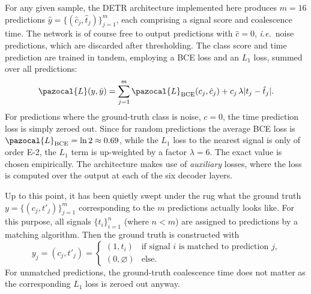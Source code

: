 For any given sample, the DETR architecture implemented here produces $m=16$ predictions $\hat{y}=\{(\hat{c}_j,\hat{t}_j)\}_{j=1}^{m}$, each comprising a signal score and coalescence time. The network is of course free to output predictions with $\hat{c}=0$, \emph{i.e.}\ noise predictions, which are discarded after thresholding. The class score and time prediction are trained in tandem, employing a BCE loss and an $L_1$ loss, summed over all predictions:
\begin{equation}
	\pazocal{L}(y, \hat{y}) = \sum_{j=1}^m \pazocal{L}_\text{BCE}(c_j, \hat{c}_j) + c_j\,\lambda|t_j - \hat{t}_j|.
\end{equation}
For predictions where the ground-truth class is noise, $c=0$, the time prediction loss is simply zeroed out. Since for random predictions the average BCE loss is $\pazocal{L}_\text{BCE}=\ln 2\approx0.69$, while the  $L_1$ loss to the nearest signal is only of order \SI{E-2}{}, the $L_1$ term is up-weighted by a factor $\lambda=6$. The exact value is chosen empirically.
The architecture makes use of \emph{auxiliary} losses, where the loss is computed over the output at each of the six decoder layers.


Up to this point, it has been quietly swept under the rug what the ground truth $y=\{(c_j, t'_j)\}_{j=1}^{m}$ corresponding to the $m$ predictions actually looks like. 
For this purpose, all signals $\{t_i\}_{i=1}^{n}$ (where $n<m$) are assigned to predictions by a matching algorithm. Then the ground truth is constructed with
\begin{equation}
	\label{eq:detr:ground_truth}
	y_j = (c_j, t'_j) = \begin{cases}
		(1, t_i) & \text{if signal $i$ is matched to prediction $j$,} \\
		(0, \varnothing) & \text{else.}
	\end{cases}
\end{equation}
For unmatched predictions, the ground-truth coalescence time does not matter as the corresponding $L_1$ loss is zeroed out anyway.

